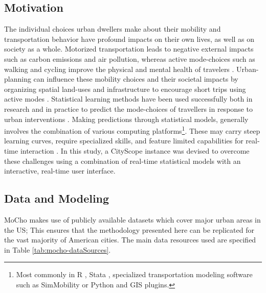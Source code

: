 {    \subsection{Motivation}
    {
        The individual choices urban dwellers make about their mobility and transportation behavior have profound impacts on their own lives, as well as on society as a whole. Motorized transportation leads to negative external impacts such as carbon emissions and air pollution, whereas active mode-choices such as walking and cycling improve the physical and mental health of travelers \cite{doorley2015quantifying, mueller2015health}. Urban-planning can influence these mobility choices and their societal impacts by organizing spatial land-uses and infrastructure to encourage short trips using active modes \cite{handy2002built, saelens2003environmental}. Statistical learning methods have been used successfully both in research and in practice to predict the mode-choices of travellers in response to urban interventions \cite{ben1999discrete, wardman2007factors, habib2009investigation, buehler2016bikeway}.
        \newline
        Making predictions through statistical models, generally involves the combination of various computing platforms\footnote{Most commonly in R \cite{hasan2014fast}, Stata \cite{gu2013fitting}, specialized transportation modeling software such as SimMobility \cite{adnan2016simmobility} or Python and GIS plugins.}. These may carry steep learning curves, require specialized skills, and feature limited capabilities for real-time interaction \cite{ben-joseph2001}. In this study, a CityScope instance was devised to overcome these challenges using a combination of real-time statistical models with an interactive, real-time user interface.
    }

    \subsection{Data and Modeling} \label{sec:mocho-models-data}

    {
        MoCho makes use of publicly available datasets which cover major urban areas in the US; This ensures that the methodology presented here can be replicated for the vast majority of American cities. The main data resources used are specified in Table \ref{tab:mocho-dataSources}.

}}
